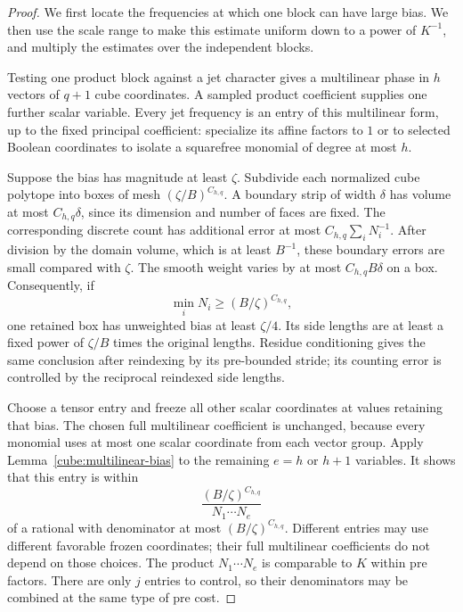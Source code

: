 \begin{proof}
We first locate the frequencies at which one block can have
large bias. We then use the scale range to make this estimate
uniform down to a power of $K^{-1}$, and multiply the estimates
over the independent blocks.

Testing one product block against a jet character gives a
multilinear phase in $h$ vectors of $q+1$ cube coordinates.
A sampled product coefficient supplies one further scalar
variable. Every jet frequency is an entry of this multilinear
form, up to the fixed principal coefficient: specialize its
affine factors to $1$ or to selected Boolean coordinates to
isolate a squarefree monomial of degree at most $h$.

Suppose the bias has magnitude at least $\zeta$. Subdivide
each normalized cube polytope into boxes of mesh
$(\zeta/B)^{C_{h,q}}$. A boundary strip of width $\delta$
has volume at most $C_{h,q}\delta$, since its dimension and
number of faces are fixed. The corresponding discrete count
has additional error at most $C_{h,q}\sum_iN_i^{-1}$.
After division by the domain volume, which is at least
$B^{-1}$, these boundary errors are small compared with
$\zeta$. The smooth weight varies by at most
$C_{h,q}B\delta$ on a box. Consequently, if
\[
                    \min_iN_i\ge(B/\zeta)^{C_{h,q}},
\]
one retained box has unweighted bias at least $\zeta/4$.
Its side lengths are at least a fixed power of $\zeta/B$
times the original lengths. Residue conditioning gives the
same conclusion after reindexing by its pre-bounded stride;
its counting error is controlled by the reciprocal reindexed
side lengths.

Choose a tensor entry and freeze all other scalar coordinates
at values retaining that bias. The chosen full multilinear
coefficient is unchanged, because every monomial uses at most
one scalar coordinate from each vector group. Apply
Lemma~\ref{cube:multilinear-bias} to the remaining $e=h$ or
$h+1$ variables. It shows that this entry is within
\[
              \frac{(B/\zeta)^{C_{h,q}}}{N_1\cdots N_e}
\]
of a rational with denominator at most
$(B/\zeta)^{C_{h,q}}$. Different entries may use different
favorable frozen coordinates; their full multilinear
coefficients do not depend on those choices. The product
$N_1\cdots N_e$ is comparable to $K$ within pre factors.
There are only $j$ entries to control, so their denominators
may be combined at the same type of pre cost.


\end{proof}
